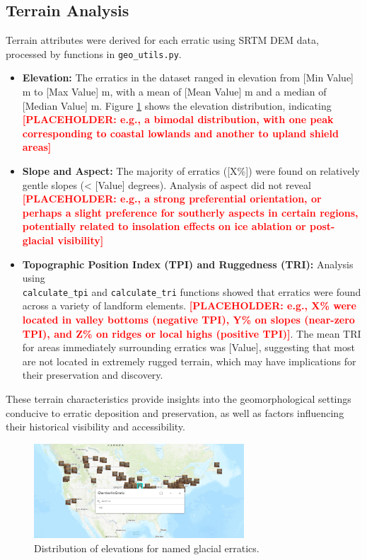 \documentclass[
11pt, %
english, %
singlespacing, %
headsepline, %
]{MastersDoctoralThesis} %
\newcommand{\placeholdertext}[1]{\textcolor{red}{\textbf{[PLACEHOLDER: #1]}}}
\begin{document}
\subsection{Terrain Analysis}
\label{subsec:terrain_analysis_results}
Terrain attributes were derived for each erratic using SRTM DEM data, processed by functions in \texttt{geo\_utils.py}.
\begin{itemize}
    \item \textbf{Elevation:} The erratics in the dataset ranged in elevation from [Min Value] m to [Max Value] m, with a mean of [Mean Value] m and a median of [Median Value] m. Figure \ref{fig:elevation_distribution} shows the elevation distribution, indicating \placeholdertext{e.g., a bimodal distribution, with one peak corresponding to coastal lowlands and another to upland shield areas}
    \item \textbf{Slope and Aspect:} The majority of erratics ([X\%]) were found on relatively gentle slopes (< [Value] degrees). Analysis of aspect did not reveal \placeholdertext{e.g., a strong preferential orientation, or perhaps a slight preference for southerly aspects in certain regions, potentially related to insolation effects on ice ablation or post-glacial visibility}
    \item \textbf{Topographic Position Index (TPI) and Ruggedness (TRI):} Analysis using \\ \texttt{calculate\_tpi} and \texttt{calculate\_tri} functions showed that erratics were found across a variety of landform elements. \placeholdertext{e.g., X\% were located in valley bottoms (negative TPI), Y\% on slopes (near-zero TPI), and Z\% on ridges or local highs (positive TPI)}. The mean TRI for areas immediately surrounding erratics was [Value], suggesting that most are not located in extremely rugged terrain, which may have implications for their preservation and discovery.
\end{itemize}
These terrain characteristics provide insights into the geomorphological settings conducive to erratic deposition and preservation, as well as factors influencing their historical visibility and accessibility.

\begin{figure}[H]
    \centering
    \includegraphics[width=0.7\textwidth]{Images/DigitizedMap.png} %
    \caption{Distribution of elevations for named glacial erratics. }
    \label{fig:elevation_distribution}
\end{figure}
\end{document}
